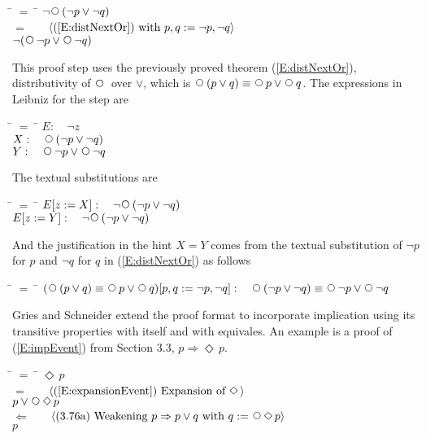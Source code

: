 \documentclass[fleqn, leqno]{article}
\newcommand{\lgap}{2pt}                             %
\newcommand{\mymathindent}{24pt}                    %
\newcommand{\impl}{\ensuremath{\Rightarrow}}        %
\newcommand{\foll}{\ensuremath{\Leftarrow}}         %
\newcommand{\Next}{\;\,\text{\raisebox{3.5pt}{\circle{6}}}}
\newcommand{\Event}{\Diamond\,}
\newcommand{\Gll} {\langle}                         %
\newcommand{\Ggg} {\rangle}                         %
\newcommand{\Hint}[1]     {\ \ \ $\Gll              \mbox{#1} \Ggg$ }   %
\begin{document}
\begin{tabbing}
\hspace{\mymathindent} \= $= \;$ \= \kill
  \> \>   $\neg\Next (\neg p \lor \neg q)$\\[\lgap]
  \> $=$  \>  \Hint{(\ref{E:distNextOr}) with $p,q := \neg p, \neg q$}\\[\lgap]
  \> \>   $\neg (\Next\neg p \lor \Next \neg q)$
\end{tabbing}

This proof step uses the previously proved theorem (\ref{E:distNextOr}), distributivity of $\Next$ over $\lor$,
which is $\Next (p \lor q) \equiv \Next p \lor \Next q$.
The expressions in Leibniz for the step are

\begin{tabbing}
\hspace{\mymathindent} \= $= \;$ \= \kill
  \> $E:\quad \neg z$\\[\lgap]
  \> $X:\quad \Next (\neg p \lor \neg q)$\\[\lgap]
  \> $Y:\quad \Next \neg p \lor \Next \neg q$
\end{tabbing}

The textual substitutions are

\begin{tabbing}
\hspace{\mymathindent} \= $= \;$ \= \kill
  \> $E[z:=X]:\quad \neg\Next (\neg p \lor \neg q)$\\[\lgap]
  \> $E[z:=Y]:\quad \neg\Next (\neg p \lor \neg q)$
\end{tabbing}

And the justification in the hint $X=Y$ comes from the textual substitution of $\neg p$ for $p$
and $\neg q$ for $q$ in (\ref{E:distNextOr}) as follows

\begin{tabbing}
\hspace{\mymathindent} \= $= \;$ \= \kill
  \> $(\Next (p \lor q) \equiv \Next p \lor \Next q)[p,q:=\neg p, \neg q]:\quad
      \Next (\neg p \lor \neg q) \equiv \Next \neg p \lor \Next \neg q$
\end{tabbing}

Gries and Schneider \cite{LADM} extend the proof format to incorporate implication using its transitive properties
with itself and with equivales.
An example is a proof of (\ref{E:impEvent}) from Section 3.3, $p \impl \Event p$.

\begin{tabbing}
\hspace{\mymathindent} \= $= \;$ \= \kill
  \> \>   $\Event p$\\[\lgap]
  \> $=$  \>  \Hint{(\ref{E:expansionEvent}) Expansion of $\Event$}\\[\lgap]
  \> \>   $p \lor \Next\Event p$\\[\lgap]
  \> $\foll$  \>  \Hint{(3.76a) Weakening $p\impl p\lor q$ with $q:=\Next\Event p$}\\[\lgap]
  \> \>   $p$
\end{tabbing}
\end{document}
